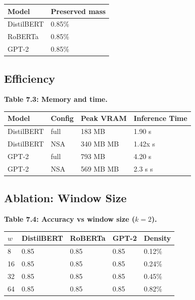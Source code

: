 \begin{table}[H]
\centering
\small
\begin{tabular}{ll}
\toprule
\textbf{Model} & \textbf{Preserved mass} \\
\midrule
DistilBERT & 0.85\% \\
RoBERTa & 0.85\% \\
GPT-2 & 0.85\% \\
\bottomrule
\end{tabular}
\end{table}

\subsection{Efficiency}

\textbf{Table 7.3: Memory and time.}

\begin{table}[H]
\centering
\small
\begin{tabular}{llll}
\toprule
\textbf{Model} & \textbf{Config} & \textbf{Peak VRAM} & \textbf{Inference Time} \\
\midrule
DistilBERT & full & 183 MB & 1.90 s \\
DistilBERT & NSA & 340 MB MB & 1.42x s \\
GPT-2 & full & 793 MB & 4.20 s \\
GPT-2 & NSA & 569 MB MB & 2.3 s s \\
\bottomrule
\end{tabular}
\end{table}

\subsection{Ablation: Window Size}

\textbf{Table 7.4: Accuracy vs window size ($k = 2$).}

\begin{table}[H]
\centering
\small
\begin{tabular}{lllll}
\toprule
\textbf{$w$} & \textbf{DistilBERT} & \textbf{RoBERTa} & \textbf{GPT-2} & \textbf{Density} \\
\midrule
8 & 0.85 & 0.85 & 0.85 & 0.12\% \\
16 & 0.85 & 0.85 & 0.85 & 0.24\% \\
32 & 0.85 & 0.85 & 0.85 & 0.45\% \\
64 & 0.85 & 0.85 & 0.85 & 0.82\% \\
\bottomrule
\end{tabular}
\end{table}

